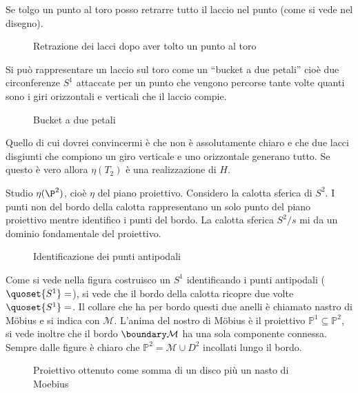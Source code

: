 Se tolgo un punto al toro posso retrarre tutto il laccio nel punto (come si vede nel disegno).

\begin{figure}
	\centering 
	
	\caption{Retrazione dei lacci dopo aver tolto un punto al toro}
\end{figure}

Si può rappresentare un laccio sul toro come un ``bucket a due petali'' cioè due circonferenze $S^{1}$ attaccate per un punto che vengono percorse tante volte quanti sono i giri
orizzontali e verticali che il laccio compie.

\begin{figure}
	\centering 
	
	\caption{Bucket a due petali}
\end{figure}

Quello di cui dovrei convincermi è che non è assolutamente chiaro e che due lacci disgiunti che compiono un giro verticale e uno orizzontale generano tutto. Se questo è vero allora $\eta(T_{2})$ 
è una realizzazione di $H$.


Studio $\eta(\P^{2})$, cioè $\eta$ del piano proiettivo. Considero la calotta sferica di $S^2$. I punti non del bordo della calotta rappresentano un solo punto del piano proiettivo mentre
identifico i punti del bordo. La calotta sferica $S^{2}/s$ mi da un dominio fondamentale del proiettivo.

\begin{figure}
	\centering 
	
	\caption{Identificazione dei punti antipodali}
\end{figure}

Come si vede nella figura costruisco un $S^1$ identificando i punti antipodali ($\quoset{S^1}=$), si vede che il bordo della calotta ricopre due volte $\quoset{S^1}=$. Il collare che ha per bordo questi due anelli
è chiamato nastro di Möbius e si indica con $\mathcal{M}$. 
L'anima del nostro di Möbius è il proiettivo $\mathbb{P}^1 \subseteq \mathbb{P}^2 $, si vede inoltre che il bordo $\boundary \mathcal{M}$ ha una sola componente connessa.
Sempre dalle figure è chiaro che $\mathbb{P}^2 = \mathcal{M} \cup D^{2}$ incollati lungo il bordo.

\begin{figure}
	\centering 
	
	\caption{Proiettivo ottenuto come somma di un disco più un nasto di Moebius}
\end{figure}


